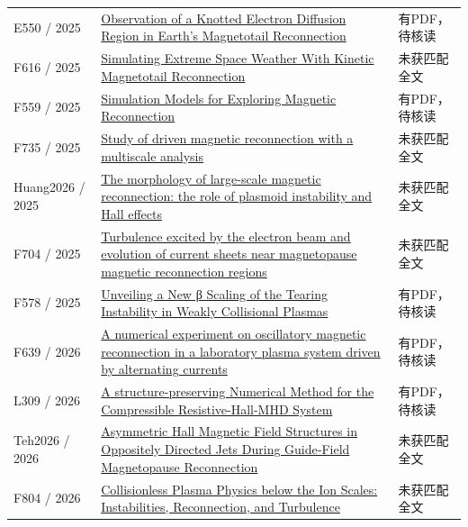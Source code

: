 \documentclass[UTF8,a4paper,11pt,openany,fontset=fandol]{ctexbook}
\begin{document}
\begin{longtable}{P{24mm}P{97mm}P{27mm}}
E550 / 2025 & \href{https://doi.org/10.1029/2025gl117612}{Observation of a Knotted Electron Diffusion Region in Earth's Magnetotail Reconnection} & 有PDF，待核读\\

F616 / 2025 & \href{https://doi.org/10.1029/2024sw004057}{Simulating Extreme Space Weather With Kinetic Magnetotail Reconnection} & 未获匹配全文\\

F559 / 2025 & \href{https://doi.org/10.1007/s11214-025-01210-5}{Simulation Models for Exploring Magnetic Reconnection} & 有PDF，待核读\\

F735 / 2025 & \href{https://doi.org/10.1080/10420150.2025.2475389}{Study of driven magnetic reconnection with a multiscale analysis} & 未获匹配全文\\

Huang2026 / 2025 & \href{https://doi.org/10.1080/10420150.2025.2598789}{The morphology of large-scale magnetic reconnection: the role of plasmoid instability and Hall effects} & 未获匹配全文\\

F704 / 2025 & \href{https://doi.org/10.1088/1361-6587/adfe19}{Turbulence excited by the electron beam and evolution of current sheets near magnetopause magnetic reconnection regions} & 未获匹配全文\\

F578 / 2025 & \href{https://doi.org/10.3847/1538-4357/ae046e}{Unveiling a New β Scaling of the Tearing Instability in Weakly Collisional Plasmas} & 有PDF，待核读\\

F639 / 2026 & \href{https://doi.org/10.1063/5.0323293}{A numerical experiment on oscillatory magnetic reconnection in a laboratory plasma system driven by alternating currents} & 有PDF，待核读\\

L309 / 2026 & \href{https://arxiv.org/abs/2607.14286}{A structure-preserving Numerical Method for the Compressible Resistive-Hall-MHD System} & 有PDF，待核读\\

Teh2026 / 2026 & \href{https://doi.org/10.1029/2026ja035335}{Asymmetric Hall Magnetic Field Structures in Oppositely Directed Jets During Guide‐Field Magnetopause Reconnection} & 未获匹配全文\\

F804 / 2026 & \href{https://dspace.mit.edu/handle/1721.1/169938}{Collisionless Plasma Physics below the Ion Scales: Instabilities,  Reconnection,  and Turbulence} & 未获匹配全文\\


\end{longtable}
\end{document}
